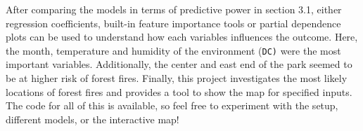\documentclass{article}
\begin{document}
After comparing the models in terms of predictive power in section 3.1, either regression coefficients, built-in feature importance tools or partial dependence plots can be used to understand how each variables influences the outcome. Here, the month, temperature and humidity of the environment (\texttt{DC)} were the most important variables. Additionally, the center and east end of the park seemed to be at higher risk of forest fires. Finally, this project investigates the most likely locations of forest fires and provides a tool to show the map for specified inputs. The code for all of this is available, so feel free to experiment with the setup, different models, or the interactive map!


\end{document}
